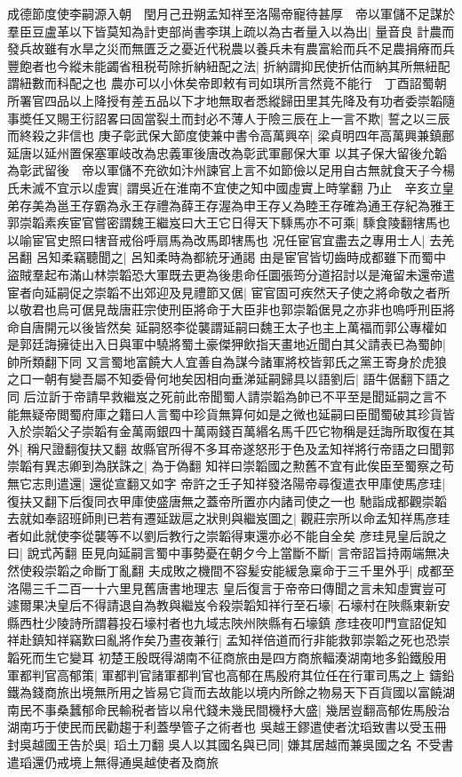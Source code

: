 成德節度使李嗣源入朝　閏月己丑朔孟知祥至洛陽帝寵待甚厚　帝以軍儲不足謀於羣臣豆盧革以下皆莫知為計吏部尚書李琪上疏以為古者量入以為出|{
	量音良}
計農而發兵故雖有水旱之災而無匱乏之憂近代税農以養兵未有農富給而兵不足農捐瘠而兵豐飽者也今縱未能蠲省租税苟除折納紐配之法|{
	折納謂抑民使折估而納其所無紐配謂紐數而科配之也}
農亦可以小休矣帝即敕有司如琪所言然竟不能行　丁酉詔蜀朝所署官四品以上降授有差五品以下才地無取者悉縱歸田里其先降及有功者委崇韜隨事奬任又賜王衍詔畧曰固當裂土而封必不薄人于險三辰在上一言不欺|{
	誓之以三辰而終殺之非信也}
庚子彰武保大節度使兼中書令高萬興卒|{
	梁貞明四年高萬興兼鎮鄜延唐以延州置保塞軍岐改為忠義軍後唐改為彰武軍鄜保大軍}
以其子保大留後允韜為彰武留後　帝以軍儲不充欲如汴州諫官上言不如節儉以足用自古無就食天子今楊氏未滅不宜示以虛實|{
	謂吳近在淮南不宜使之知中國虛實上時掌翻}
乃止　辛亥立皇弟存美為邕王存霸為永王存禮為薛王存渥為申王存乂為睦王存確為通王存紀為雅王　郭崇韜素疾宦官嘗密謂魏王繼岌曰大王它日得天下騬馬亦不可乘|{
	騬食陵翻犗馬也以喻宦官史照曰犗音戒俗呼扇馬為改馬即犗馬也}
况任宦官宜盡去之專用士人|{
	去羌呂翻}
呂知柔竊聽聞之|{
	呂知柔時為都統牙通謁}
由是宦官皆切齒時成都雖下而蜀中盜賊羣起布滿山林崇韜恐大軍既去更為後患命任圜張筠分道招討以是淹留未還帝遣宦者向延嗣促之崇韜不出郊迎及見禮節又倨|{
	宦官固可疾然天子使之將命敬之者所以敬君也烏可倨見哉唐莊宗使刑臣將命于大臣非也郭崇韜倨見之亦非也嗚呼刑臣將命自唐開元以後皆然矣}
延嗣怒李從襲謂延嗣曰魏王太子也主上萬福而郭公專權如是郭廷誨擁徒出入日與軍中驍將蜀土豪傑狎飲指天畫地近聞白其父請表已為蜀帥|{
	帥所類翻下同}
又言蜀地富饒大人宜善自為謀今諸軍將校皆郭氏之黨王寄身於虎狼之口一朝有變吾屬不知委骨何地矣因相向垂涕延嗣歸具以語劉后|{
	語牛倨翻下語之同}
后泣訢于帝請早救繼岌之死前此帝聞蜀人請崇韜為帥已不平至是聞延嗣之言不能無疑帝閲蜀府庫之籍曰人言蜀中珍貨無算何如是之微也延嗣曰臣聞蜀破其珍貨皆入於崇韜父子崇韜有金萬兩銀四十萬兩錢百萬緡名馬千匹它物稱是廷誨所取復在其外|{
	稱尺證翻復扶又翻}
故縣官所得不多耳帝遂怒形于色及孟知祥將行帝語之曰聞郭崇韜有異志卿到為朕誅之|{
	為于偽翻}
知祥曰崇韜國之勲舊不宜有此俟臣至蜀察之苟無它志則遣還|{
	還從宣翻又如字}
帝許之壬子知祥發洛陽帝尋復遣衣甲庫使馬彦珪|{
	復扶又翻下后復同衣甲庫使盛唐無之蓋帝所置亦内諸司使之一也}
馳詣成都觀崇韜去就如奉詔班師則已若有遷延跋扈之狀則與繼岌圖之|{
	觀莊宗所以命孟知祥馬彦珪者如此就使李從襲等不以劉后教行之崇韜得東還亦必不能自全矣}
彦珪見皇后說之曰|{
	說式芮翻}
臣見向延嗣言蜀中事勢憂在朝夕今上當斷不斷|{
	言帝詔旨持兩端無决然使殺崇韜之命斷丁亂翻}
夫成敗之機間不容髪安能緩急稟命于三千里外乎|{
	成都至洛陽三千二百一十六里見舊唐書地理志}
皇后復言于帝帝曰傳聞之言未知虛實豈可遽爾果决皇后不得請退自為教與繼岌令殺崇韜知祥行至石壕|{
	石壕村在陜縣東新安縣西杜少陵詩所謂暮投石壕村者也九域志陜州陜縣有石壕鎮}
彦珪夜叩門宣詔促知祥赴鎮知祥竊歎曰亂將作矣乃晝夜兼行|{
	孟知祥倍道而行非能救郭崇韜之死也恐崇韜死而生它變耳}
初楚王殷既得湖南不征商旅由是四方商旅輻湊湖南地多鉛鐵殷用軍都判官高郁策|{
	軍都判官諸軍都判官也高郁在馬殷府其位任在行軍司馬之上}
鑄鉛鐵為錢商旅出境無所用之皆易它貨而去故能以境内所餘之物易天下百貨國以富饒湖南民不事桑蠶郁命民輸税者皆以帛代錢未幾民間機杼大盛|{
	幾居豈翻高郁佐馬殷治湖南巧于使民而民勸趨于利蓋學管子之術者也}
吳越王鏐遣使者沈瑫致書以受玉冊封吳越國王告於吳|{
	瑫土刀翻}
吳人以其國名與已同|{
	嫌其居越而兼吳國之名}
不受書遣瑫還仍戒境上無得通吳越使者及商旅

